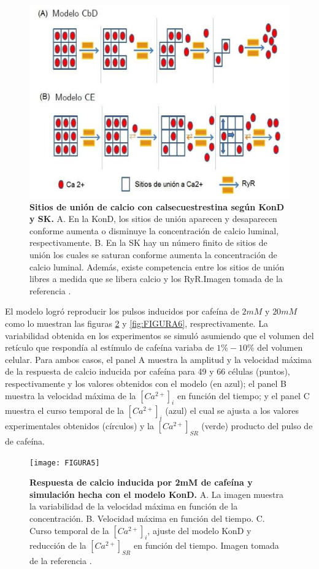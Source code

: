 \documentclass[draft]{article}
\newcommand{\Cai}{[Ca^{2+}]_{i}}
\newcommand{\Cal}{[Ca^{2+}]_{SR}}
\begin{document}
\begin{figure}[h]
	\centering
	\includegraphics{FIGURA12}
	\caption{\textbf{Sitios de unión de calcio con calsecuestrestina según KonD y SK.} A. En la KonD, los sitios de unión aparecen y desaparecen conforme aumenta o disminuye la concentración de calcio luminal, respectivamente. B. En la SK hay un número finito de sitios de unión los cuales se saturan conforme aumenta la concentración de calcio luminal. Además, existe competencia entre los sitios de unión libres a medida que se libera calcio y los RyR.Imagen tomada de la referencia \cite{Perez-Rosas2016}.}
	\label{fig:FIGURA12}
\end{figure}

El modelo logró reproducir los pulsos inducidos por cafeína de $2mM$ y $20mM$ como lo muestran las figuras \ref{fig:FIGURA5} y \ref{fig:FIGURA6}, resprectivamente. La variabilidad obtenida en los experimentos se simuló asumiendo que el volumen del retículo que respondía al estímulo de cafeína variaba de $1\% - 10\%$ del volumen celular. Para ambos casos, el panel A muestra la amplitud y la velocidad máxima de la respuesta de calcio inducida por cafeína para 49 y 66 células (puntos), respectivamente y los valores obtenidos con el modelo (en azul); el panel B muestra la velocidad máxima de la $\Cai$ en función del tiempo; y el panel C muestra el curso temporal de la $\Cai$ (azul) el cual se ajusta a los valores experimentales obtenidos (círculos) y la $\Cal$ (verde) producto del pulso de de cafeína. \\

\begin{figure}[h]
	\centering
	\texttt{[image: FIGURA5]}
	\caption{\textbf{Respuesta de calcio inducida por 2mM de cafeína y simulación hecha con el modelo KonD.} A. La imagen muestra la variabilidad de la velocidad máxima en función de la concentración. B. Velocidad máxima en función del tiempo. C. Curso temporal de la $\Cai$, ajuste del modelo KonD y reducción de la $\Cal$ en función del tiempo. Imagen tomada de la referencia \cite{Perez-Rosas2015}.}
	\label{fig:FIGURA5}
\end{figure}
\end{document}
